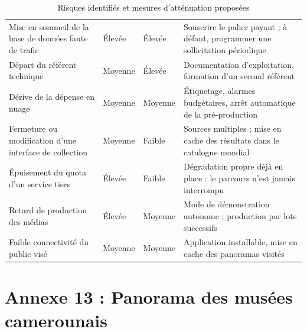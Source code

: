 \begin{table}[htbp]
\centering
\caption{Risques identifiés et mesures d'atténuation proposées}
\label{tab:risques}
\small
\begin{tabularx}{\textwidth}{|L{3.7cm}|C{2.1cm}|C{1.7cm}|X|}
\hline
{}
 &  &  &  \\ \hline
Mise en sommeil de la base de données faute de trafic & Élevée & Élevée & Souscrire le palier payant ; à défaut, programmer une sollicitation périodique \\ \hline
Départ du référent technique & Moyenne & Élevée & Documentation d'exploitation, formation d'un second référent \\ \hline
Dérive de la dépense en nuage & Moyenne & Moyenne & Étiquetage, alarmes budgétaires, arrêt automatique de la pré-production \\ \hline
Fermeture ou modification d'une interface de collection & Moyenne & Faible & Sources multiples ; mise en cache des résultats dans le catalogue mondial \\ \hline
Épuisement du quota d'un service tiers & Élevée & Faible & Dégradation propre déjà en place : le parcours n'est jamais interrompu \\ \hline
Retard de production des médias & Élevée & Moyenne & Mode de démonstration autonome ; production par lots successifs \\ \hline
Faible connectivité du public visé & Moyenne & Moyenne & Application installable, mise en cache des panoramas visités \\ \hline
\end{tabularx}
\end{table}
\cleardoublepage
\chapter*{Annexe 13 : Panorama des musées camerounais}

\vspace{0.3cm}

